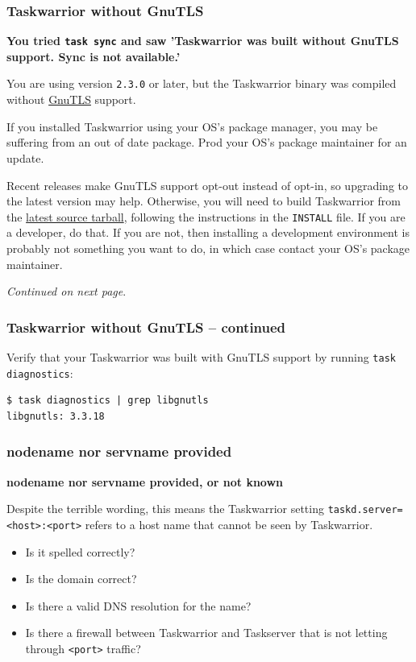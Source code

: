 \documentclass[t,handout]{beamer}
\begin{document}
\begin{frame}[fragile]\frametitle{Taskwarrior without GnuTLS}
    \textbf{You tried \texttt{task sync} and saw 'Taskwarrior was built without GnuTLS support.  Sync is not available.'}

    You are using version \verb+2.3.0+ or later, but the Taskwarrior binary was compiled without \href{http://www.gnutls.org}{GnuTLS} support.

    If you installed Taskwarrior using your OS's package manager, you may be suffering from an out of date package. Prod your OS's package maintainer for an update.

    Recent releases make GnuTLS support opt-out instead of opt-in, so upgrading to the latest version may help. Otherwise, you will need to build Taskwarrior from the \href{http://taskwarrior.org/download/task-latest.tar.gz}{latest source tarball}, following the instructions in the \verb+INSTALL+ file. If you are a developer, do that. If you are not, then installing a development environment is probably not something you want to do, in which case contact your OS's package maintainer.

    \emph{Continued on next page}.
\end{frame}

\begin{frame}[fragile]\frametitle{Taskwarrior without GnuTLS -- continued}
    Verify that your Taskwarrior was built with GnuTLS support by running \verb+task diagnostics+:

    \begin{lstlisting}
$ task diagnostics | grep libgnutls
libgnutls: 3.3.18\end{lstlisting}
\end{frame}

\begin{frame}[fragile]\frametitle{nodename nor servname provided}
    \textbf{nodename nor servname provided, or not known}

    Despite the terrible wording, this means the Taskwarrior setting \verb+taskd.server=<host>:<port>+ refers to a host name that cannot be seen by Taskwarrior.

    \begin{itemize}
        \item Is it spelled correctly?
        \item Is the domain correct?
        \item Is there a valid DNS resolution for the name?
        \item Is there a firewall between Taskwarrior and Taskserver that is not letting through \verb+<port>+ traffic?
    \end{itemize}
\end{frame}
\end{document}
